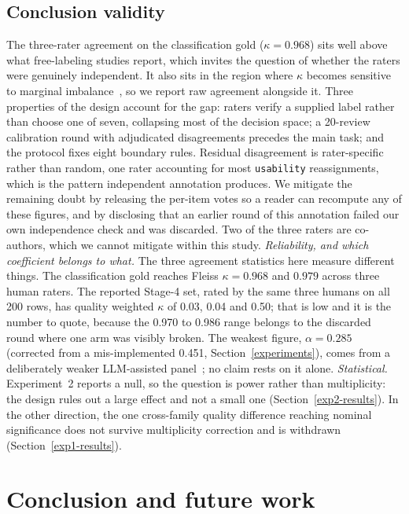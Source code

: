 \documentclass[preprint,12pt]{elsarticle}
\begin{document}
\subsection{Conclusion validity} The three-rater agreement on the classification gold ($\kappa = 0.968$) sits well above what free-labeling studies report, which invites the question of whether the raters were genuinely independent. It also sits in the region where $\kappa$ becomes sensitive to marginal imbalance~\cite{feinstein1990high}, so we report raw agreement alongside it. Three properties of the design account for the gap: raters verify a supplied label rather than choose one of seven, collapsing most of the decision space; a 20-review calibration round with adjudicated disagreements precedes the main task; and the protocol fixes eight boundary rules. Residual disagreement is rater-specific rather than random, one rater accounting for most \texttt{usability} reassignments, which is the pattern independent annotation produces. We mitigate the remaining doubt by releasing the per-item votes so a reader can recompute any of these figures, and by disclosing that an earlier round of this annotation failed our own independence check and was discarded. Two of the three raters are co-authors, which we cannot mitigate within this study.
\emph{Reliability, and which coefficient belongs to what.} The three agreement statistics here measure different things. The classification gold reaches Fleiss $\kappa = 0.968$ and $0.979$ across three human raters. The reported Stage-4 set, rated by the same three humans on all 200 rows, has quality weighted $\kappa$ of 0.03, 0.04 and 0.50; that is low and it is the number to quote, because the 0.970 to 0.986 range belongs to the discarded round where one arm was visibly broken. The weakest figure, $\alpha = 0.285$ (corrected from a mis-implemented 0.451, Section~\ref{experiments}), comes from a deliberately weaker LLM-assisted panel~\cite{gilardi2023chatgpt}; no claim rests on it alone.
\emph{Statistical.} Experiment~2 reports a null, so the question is power rather than multiplicity: the design rules out a large effect and not a small one (Section~\ref{exp2-results}). In the other direction, the one cross-family quality difference reaching nominal significance does not survive multiplicity correction and is withdrawn (Section~\ref{exp1-results}).

\section{Conclusion and future work}\label{conclusion}
\end{document}
